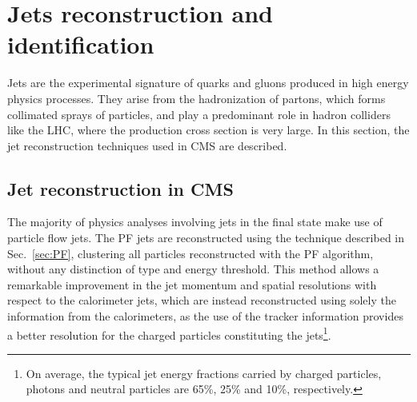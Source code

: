 \section{Jets reconstruction and identification}\label{sec:jets}

Jets are the experimental signature of quarks and gluons produced in high energy physics processes. They arise from the hadronization of partons, which forms collimated sprays of particles, and play a predominant role in hadron colliders like the LHC, where the production cross section is very large. In this section, the jet reconstruction techniques used in CMS are described.

\subsection{Jet reconstruction in CMS}

The majority of physics analyses involving jets in the final state make use of particle flow jets. The PF jets are reconstructed using the technique described in Sec.~\ref{sec:PF}, clustering all particles reconstructed with the PF algorithm, without any distinction of type and energy threshold. This method allows a remarkable improvement in the jet momentum and spatial resolutions with respect to the calorimeter jets, which are instead reconstructed using solely the information from the calorimeters, as the use of the tracker information provides a better \pt resolution for the charged particles constituting the jets\footnote{On average, the typical jet energy fractions carried by charged particles, photons and neutral particles are 65\%, 25\% and 10\%, respectively.}. 

